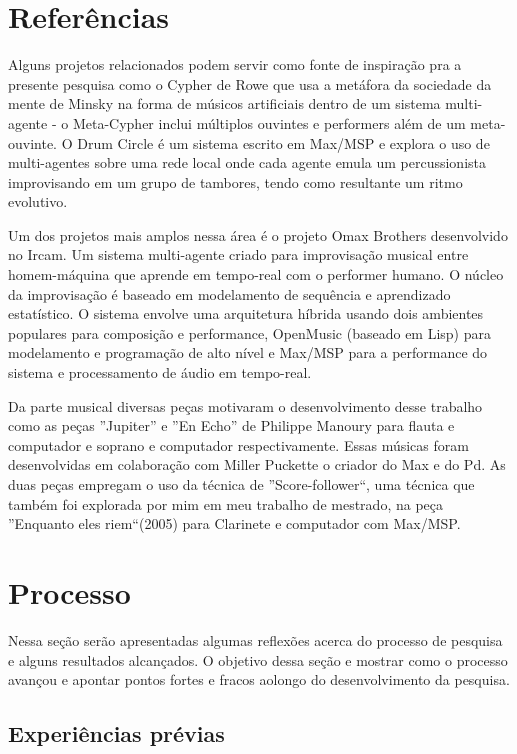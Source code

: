 \documentclass{ppgmus}
\begin{document}
\section{Referências}

Alguns projetos relacionados podem servir como fonte de inspiração pra
a presente pesquisa como o Cypher \cite{rowe93:interactive}   de Rowe que usa a metáfora da
sociedade da mente de Minsky na forma de músicos artificiais dentro de
um sistema multi-agente - o Meta-Cypher inclui múltiplos ouvintes e
performers além de um meta-ouvinte.  O Drum Circle \cite{eigenfeld07:drum} é um sistema escrito em Max/MSP e explora o uso de
multi-agentes sobre uma rede local onde cada agente emula um
percussionista improvisando em um grupo de tambores, tendo como
resultante um ritmo evolutivo.

Um dos projetos mais amplos nessa área é o projeto Omax Brothers \cite{assayag06:omax}
desenvolvido no Ircam. Um sistema multi-agente criado para
improvisação musical entre homem-máquina que aprende em tempo-real com
o performer humano. O núcleo da improvisação é baseado em modelamento
de sequência e aprendizado estatístico. O sistema envolve uma
arquitetura híbrida usando dois ambientes populares para composição e
performance, OpenMusic (baseado em Lisp) para modelamento e
programação de alto nível e Max/MSP para a performance do sistema e
processamento de áudio em tempo-real.

Da parte musical diversas peças motivaram o desenvolvimento desse trabalho como as peças
''Jupiter'' e ''En Echo'' de Philippe Manoury para flauta e computador e soprano e computador respectivamente.
Essas músicas foram desenvolvidas em colaboração com Miller Puckette o criador do Max e do Pd. As duas 
peças empregam o uso da técnica de ''Score-follower``, uma técnica que também foi explorada por mim em
meu trabalho de mestrado, na peça ''Enquanto eles riem``(2005) para Clarinete e computador com Max/MSP.

\section{Processo}

Nessa seção serão apresentadas algumas reflexões acerca
do processo de pesquisa e alguns resultados alcançados.
O objetivo dessa seção e mostrar como o processo avançou
e apontar pontos fortes e fracos aolongo do desenvolvimento da pesquisa.

\subsection{Experiências prévias}
\end{document}

